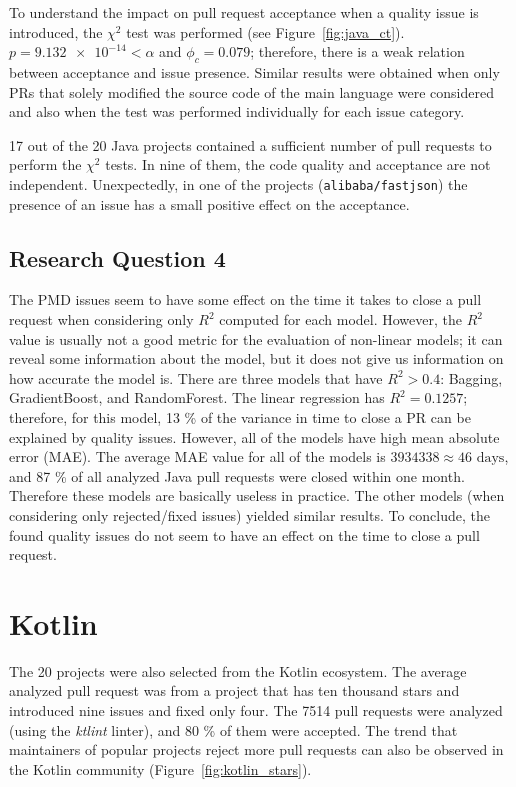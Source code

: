 \documentclass[digital,oneside,oldtable,nolof,nolot,nocover]{fithesis4}
\begin{document}
To understand the impact on pull request acceptance when a quality issue is introduced,
the \(\chi^2\) test was performed (see Figure~\ref{fig:java_ct}).
\(p = \num{9.132e-14} < \alpha\) and \(\phi_c = 0.079\); therefore, there is
a weak relation between acceptance and issue presence. Similar results were
obtained when only PRs that solely modified the source code of the main language were
considered and also when the test was performed individually for each issue category.

17 out of the 20 Java projects contained a sufficient number of pull requests to
perform the \(\chi^2\) tests. In nine of them, the code quality and acceptance are
not independent. Unexpectedly, in one of the projects (\texttt{alibaba/fastjson}) the
presence of an issue has a small positive effect on the acceptance.
\subsection{Research Question 4}
\label{sec:org263e406}
The PMD issues seem to have some effect on the time it takes to close a pull
request when considering only \(R^2\) computed for each model. However, the
\(R^2\) value is usually not a good metric for the evaluation of non-linear models;
it can reveal some information about the model, but it does not give us
information on how accurate the model is. There are three models that have \(R^2
    > 0.4\): Bagging, GradientBoost, and RandomForest.  The linear regression has
\(R^2 = 0.1257\); therefore, for this model, 13 \% of the variance in time to close a
PR can be explained by quality issues. However, all of the models have high mean
absolute error (MAE). The average MAE value for all of the models is \(3934338
    \approx 46\text{ days}\), and 87 \% of all analyzed Java pull requests were
closed within one month. Therefore these models are basically useless in
practice. The other models (when considering only rejected/fixed issues) yielded
similar results. To conclude, the found quality issues do not seem to have an
effect on the time to close a pull request.
\FloatBarrier
\section{Kotlin}
\label{sec:org3fe35dc}
The 20 projects were also selected from the Kotlin ecosystem.
The average analyzed pull request was from a project that has ten thousand
stars and introduced nine issues and fixed only four. The 7514 pull requests
were analyzed (using the \emph{ktlint} linter), and 80 \% of them were accepted.
The trend that maintainers of popular projects reject more pull requests can
also be observed in the Kotlin community (Figure~\ref{fig:kotlin_stars}).
\end{document}
